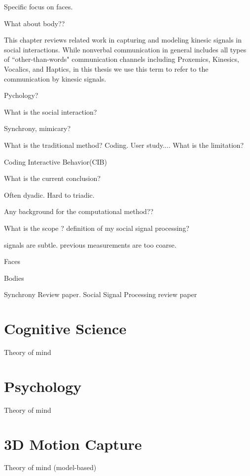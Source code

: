 Specific focus on faces. 



What about body??

 




This chapter reviews related work in capturing and modeling kinesic signals in social interactions. While nonverbal communication in general includes all types of ``other-than-words" communication channels including Proxemics, Kinesics, Vocalics, and Haptics, in this thesis we use this term to refer to the communication by kinesic signals. 




Pychology? 

What is the social interaction?

Synchrony, mimicary?


What is the traditional method? Coding. User study....  What is the limitation?


Coding Interactive Behavior(CIB)

What is the current conclusion? 


Often dyadic. Hard to triadic. 


Any background for the computational method??



What is the scope ? definition of my social signal processing?


signals are subtle. previous measurements are too coarse.


Faces

Bodies


Synchrony Review paper. 
Social Signal Processing review paper 




\section{Cognitive Science}
Theory of mind

\section{Psychology}
Theory of mind


\section{3D Motion Capture}
Theory of mind (model-based)


